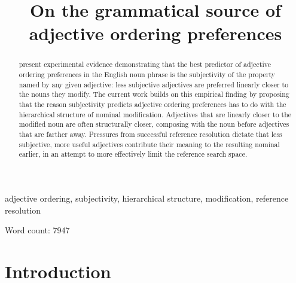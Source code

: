 \documentclass[preprint,authoryear]{elsarticle}\frenchspacing
\begin{document}
\frenchspacing 



\begin{frontmatter}

\title{On the grammatical source of adjective ordering preferences} 











\begin{abstract}
 \cite{scontrasetal2017adjectives} present experimental evidence demonstrating that the best predictor of adjective ordering preferences in the English noun phrase is the subjectivity of the property named by any given adjective: less subjective adjectives are preferred linearly closer to the nouns they modify. The current work builds on this empirical finding by proposing that the reason subjectivity predicts adjective ordering preferences has to do with the hierarchical structure of nominal modification. Adjectives that are linearly closer to the modified noun are often structurally closer, composing with the noun before adjectives that are farther away. Pressures from successful reference resolution dictate that less subjective, more useful adjectives contribute their meaning to the resulting nominal earlier, in an attempt to more effectively limit the reference search space.
\end{abstract}

\begin{keyword}
adjective ordering, subjectivity, hierarchical structure, modification, reference resolution
\end{keyword}

\end{frontmatter}

\noindent Word count: 7947

\section{Introduction}
\end{document}
